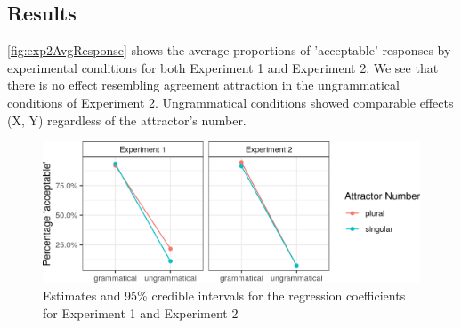 \documentclass[doc,a4paper,man,natbib,floatsintext,noextraspace]{apa6}\usepackage[]{graphicx}\usepackage[]{color}
\begin{document}

\subsection{Results} \label{sec:exp2:results}

\autoref{fig:exp2AvgResponse} shows the average proportions of 'acceptable' responses by experimental conditions for both Experiment 1 and Experiment 2. We see that there is no effect resembling agreement attraction in the ungrammatical conditions of Experiment 2. Ungrammatical conditions showed comparable effects (X, Y) regardless of the attractor's number.  
\begin{figure}[h]
\centering
\includegraphics[width=\textwidth]{figures/exp2AvgResponse-1.png}
\caption{Estimates and 95\% credible intervals for the regression coefficients for Experiment 1 and Experiment 2}
\label{fig:exp2AvgResponse}
\end{figure}
\end{document}
